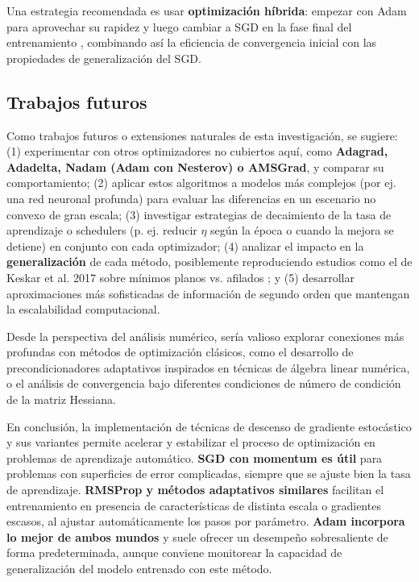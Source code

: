 \documentclass[12pt, spanish]{article}
\begin{document}
Una estrategia recomendada es usar \textbf{optimización híbrida}: empezar con Adam para aprovechar su rapidez y luego cambiar a SGD en la fase final del entrenamiento \cite{ref5}, combinando así la eficiencia de convergencia inicial con las propiedades de generalización del SGD.

\subsection{Trabajos futuros}
Como trabajos futuros o extensiones naturales de esta investigación, se sugiere: (1) experimentar con otros optimizadores no cubiertos aquí, como \textbf{Adagrad, Adadelta, Nadam (Adam con Nesterov) o AMSGrad}, y comparar su comportamiento; (2) aplicar estos algoritmos a modelos más complejos (por ej. una red neuronal profunda) para evaluar las diferencias en un escenario no convexo de gran escala; (3) investigar estrategias de decaimiento de la tasa de aprendizaje o schedulers (p. ej. reducir $\eta$ según la época o cuando la mejora se detiene) en conjunto con cada optimizador; (4) analizar el impacto en la \textbf{generalización} de cada método, posiblemente reproduciendo estudios como el de Keskar et al. 2017 sobre mínimos planos vs. afilados \cite{ref5}; y (5) desarrollar aproximaciones más sofisticadas de información de segundo orden que mantengan la escalabilidad computacional.

Desde la perspectiva del análisis numérico, sería valioso explorar conexiones más profundas con métodos de optimización clásicos, como el desarrollo de precondicionadores adaptativos inspirados en técnicas de álgebra linear numérica, o el análisis de convergencia bajo diferentes condiciones de número de condición de la matriz Hessiana.

En conclusión, la implementación de técnicas de descenso de gradiente estocástico y sus variantes permite acelerar y estabilizar el proceso de optimización en problemas de aprendizaje automático. \textbf{SGD con momentum es útil} para problemas con superficies de error complicadas, siempre que se ajuste bien la tasa de aprendizaje. \textbf{RMSProp y métodos adaptativos similares} facilitan el entrenamiento en presencia de características de distinta escala o gradientes escasos, al ajustar automáticamente los pasos por parámetro. \textbf{Adam incorpora lo mejor de ambos mundos} y suele ofrecer un desempeño sobresaliente de forma predeterminada, aunque conviene monitorear la capacidad de generalización del modelo entrenado con este método.
\end{document}
